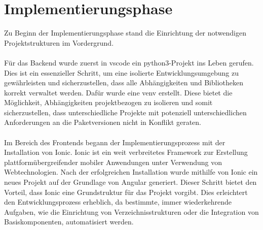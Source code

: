 \documentclass[a4paper,12pt]{article}
\begin{document}
\section{Implementierungsphase}
Zu Beginn der Implementierungsphase stand die Einrichtung der notwendigen Projektstrukturen im Vordergrund.\\
\\
Für das Backend wurde zuerst in \acrshort{vscode} ein \acrshort{python3}-Projekt ins Leben gerufen. Dies ist ein essenzieller Schritt, um eine isolierte Entwicklungsumgebung zu gewährleisten und sicherzustellen, dass alle Abhängigkeiten und Bibliotheken korrekt verwaltet werden. Dafür wurde eine \gls{venv} erstellt. Diese bietet die Möglichkeit, Abhängigkeiten projektbezogen zu isolieren und somit sicherzustellen, dass unterschiedliche Projekte mit potenziell unterschiedlichen Anforderungen an die Paketversionen nicht in Konflikt geraten.\\
\\
Im Bereich des Frontends begann der Implementierungsprozess mit der Installation von Ionic. Ionic ist ein weit verbreitetes Framework zur Erstellung plattformübergreifender mobiler Anwendungen unter Verwendung von Webtechnologien. Nach der erfolgreichen Installation wurde mithilfe von Ionic ein neues Projekt auf der Grundlage von Angular generiert. Dieser Schritt bietet den Vorteil, dass Ionic eine Grundstruktur für das Projekt vorgibt. Dies erleichtert den Entwicklungsprozess erheblich, da bestimmte, immer wiederkehrende Aufgaben, wie die Einrichtung von Verzeichnisstrukturen oder die Integration von Basiskomponenten, automatisiert werden.
\end{document}
